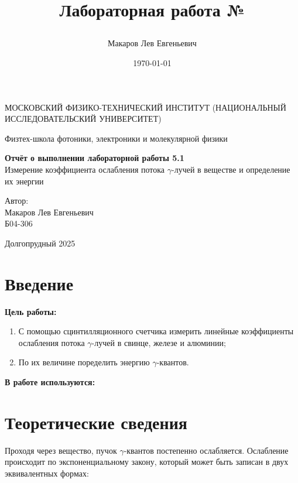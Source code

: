 \documentclass[a4paper,12pt]{article}
\author{Макаров Лев Евгеньевич}
\title{Лабораторная работа №\labnumber

\labname
}
\date{\today}
\newcommand\labname{Измерение коэффициента ослабления потока $\gamma$-лучей в веществе и определение их энергии}
\newcommand\labnumber{5.1}
\begin{document}
\begin{titlepage}
	\begin{center}
		{\large МОСКОВСКИЙ ФИЗИКО-ТЕХНИЧЕСКИЙ ИНСТИТУТ (НАЦИОНАЛЬНЫЙ ИССЛЕДОВАТЕЛЬСКИЙ УНИВЕРСИТЕТ)}
	\end{center}
	\begin{center}
		{\large Физтех-школа фотоники, электроники и молекулярной физики}
	\end{center}
	
	
	\vspace{4.5cm}
	{\huge
		\begin{center}
			{\bf Отчёт о выполнении лабораторной работы \labnumber}\\
			\labname
		\end{center}
	}
	\vspace{2cm}
	\begin{flushright}
		{\LARGE Автор:\\ Макаров Лев Евгеньевич \\
			\vspace{0.2cm}
			Б04-306}
	\end{flushright}
	\vspace{8cm}
	\begin{center}
		Долгопрудный 2025
	\end{center}
\end{titlepage}

\section{Введение}

\textbf{Цель работы:} 
\begin{enumerate}
	\item С помощью сцинтилляционного счетчика измерить линейные коэффициенты ослабления потока $\gamma$-лучей в свинце, железе и алюминии;
    \item По их величине поределить энергию $\gamma$-квантов.
\end{enumerate}

\textbf{В работе используются:} 


\section{Теоретические сведения}

Проходя через вещество, пучок $\gamma$-квантов постепенно ослабляется. Ослабление происходит по экспоненциальному закону, который может быть записан в двух эквивалентных формах:
\end{document}
